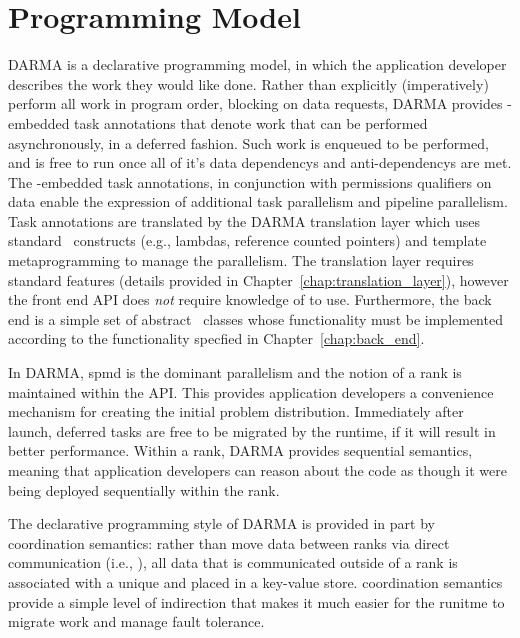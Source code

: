 \section{Programming Model}
\label{sec:programming_model}
DARMA is a \gls{declarative} \gls{programming model}, in which the application developer describes the
work they would like done. 
Rather than explicitly
(\gls{imperative}ly) perform all work in program order, blocking on data requests,
  DARMA provides \CC-embedded task annotations that denote work that can be
  performed asynchronously, in a deferred fashion.
  Such work is enqueued to be performed, and is free to run once all of it's data \glspl{dependency} and
\glspl{anti-dependency} are met.  
The \CC-embedded task annotations, in conjunction with permissions qualifiers
on data enable the expression of additional \gls{task parallelism} and
\gls{pipeline parallelism}. 
Task annotations are translated by
the DARMA \gls{translation layer} which uses standard \CC\ constructs (e.g., lambdas,
  reference counted pointers) and \gls{template
metaprogramming} to manage the parallelism.  The \gls{translation layer} requires
 standard features (details provided in
    Chapter~\ref{chap:translation_layer}), 
  however the \gls{front end} \gls{API} does \emph{not}
require knowledge of  to use. Furthermore, the \gls{back end} is a
simple set of abstract \CC\ classes whose functionality must be implemented
according to the functionality specfied in Chapter~\ref{chap:back_end}.


In DARMA, \gls{spmd} is the dominant parallelism and the notion of a \gls{rank}
is maintained within the \gls{API}.   
This provides application developers a convenience mechanism for creating
the initial problem distribution.  Immediately after launch, deferred tasks
are free to be migrated by the runtime, if it will result in
better performance. 
Within a \gls{rank}, DARMA provides \gls{sequential semantics}, 
meaning that application developers can reason about the code as
though it were being deployed sequentially within the rank.   


The declarative programming style of DARMA is provided in part by \gls{coordination
semantics}:  rather than move data between ranks via direct communication
(i.e.,  ), all data that is communicated outside
of a rank is associated with a unique  and placed in a
\gls{key-value store}.  \Gls{coordination semantics} provide a simple
level of indirection that makes it much easier for the runitme to migrate work
and manage fault tolerance.


